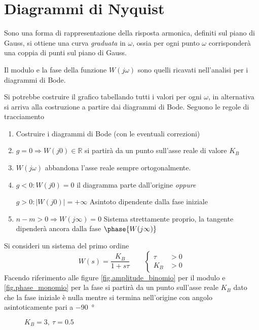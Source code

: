 
\section{Diagrammi di Nyquist}
Sono una forma di rappresentazione della risposta armonica, definiti sul piano
di Gauss, si ottiene una curva \textit{graduata} in $\omega$, ossia per ogni
punto $\omega$ corrisponderà una coppia di punti sul piano di Gauss.

Il modulo e la fase della funzione $W(j\omega)$ sono quelli ricavati
nell'analisi per i diagrammi di Bode.

Si potrebbe costruire il grafico tabellando tutti i valori per ogni $\omega$,
in alternativa si arriva alla costruzione a partire dai diagrammi di Bode.
Seguono le regole di tracciamento
\begin{enumerate}
 \item Costruire i diagrammi di Bode (con le eventuali correzioni)
 \item $g=0 \Rightarrow W(j0) \in \mathbb{R}$ si partirà da un punto sull'asse
reale di valore $K_B$
\item $W(j\omega)$ abbandona l'asse reale sempre ortogonalmente.
\item $g<0:W(j0) = 0$ il diagramma parte dall'origine \textit{oppure}

$g>0: |W(j0)| = +\infty$ Asintoto dipendente dalla fase iniziale

\item $n-m>0 \Rightarrow W(j\infty) = 0$ Sistema strettamente proprio, la
tangente dipenderà ancora dalla fase $\phase{W(j\infty)}$
\end{enumerate}

Si consideri un sistema del primo ordine
$$
W(s)  = \frac{K_B}{1+s\tau} \qquad
\left\{\begin{aligned}
\tau&>0\\
K_B&>0
\end{aligned}\right.
$$
Facendo riferimento alle figure \ref{fig.amplitude_binomio} per il modulo e
\ref{fig.phase_monomio} per la fase si partirà da un punto sull'asse reale
$K_B$ dato che la fase iniziale è nulla mentre si termina nell'origine con
angolo asintoticamente pari a \SI{-90}{\degree}
\begin{figure}[h]
\centering
\def\KB{3}
\def\TAU{0.5}
\caption{$K_B = \KB,\ \tau=\TAU$}
\end{figure}

